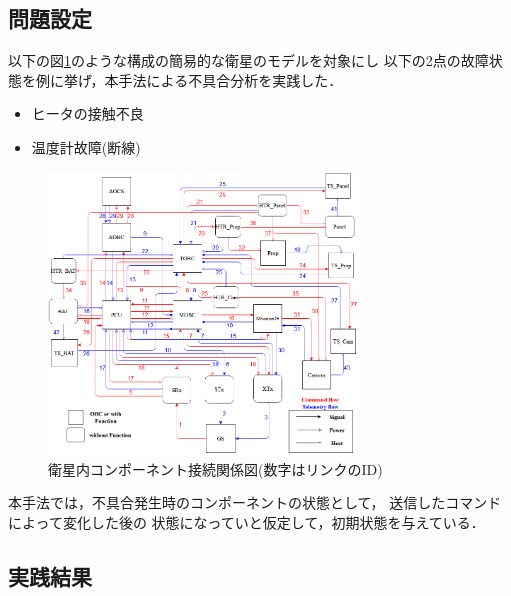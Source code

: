 \documentclass[11pt]{jsarticle}%
\begin{document}
\begin{multicols}{2}
  \subsection{問題設定}
  \vspace{-1zh}
  以下の図\ref{fig:satellite}のような構成の簡易的な衛星のモデルを対象にし
  以下の2点の故障状態を例に挙げ，本手法による不具合分析を実践した．
 \begin{itemize}
   \item ヒータの接触不良
   \item 温度計故障(断線)
 \end{itemize}
  \begin{figure}[H]
    \centering
      \includegraphics[height=7.5cm]{../figure/satellite_diagram.png}
      \caption{衛星内コンポーネント接続関係図(数字はリンクのID)}
      \label{fig:satellite}
  \end{figure}
本手法では，不具合発生時のコンポーネントの状態として，
送信したコマンドによって変化した後の
状態になっていと仮定して，初期状態を与えている．

  \vspace{-1zh}
  \subsection{実践結果}
  \vspace{-1zh}

\end{multicols}
\end{document}
